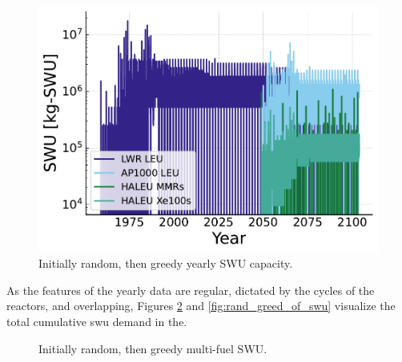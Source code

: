\begin{figure}[H]
    \centering
    \includegraphics[scale=0.7]{images/results/swu/multi_drgng_swu_by_fuel.pdf}
    \caption{Initially random, then greedy yearly SWU capacity.}
    \label{fig:swu_yearly_rand_greed}
\end{figure}

As the features of the yearly data are regular, dictated by the cycles of the reactors, and overlapping, Figures \ref{fig:rand_greed_mf_swu} and \ref{fig:rand_greed_of_swu} visualize the total cumulative \gls{swu} demand in the.


\begin{figure}[H]
  \hfill
  \caption{Initially random, then greedy multi-fuel SWU.}
  \label{fig:rand_greed_mf_swu}
\end{figure}



